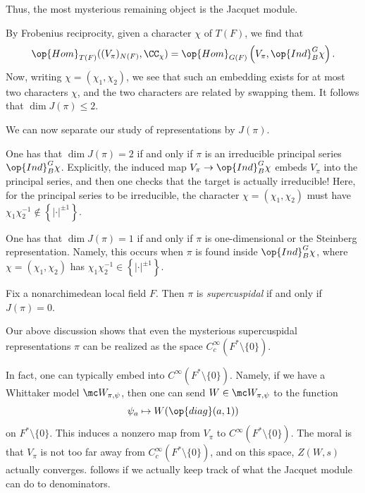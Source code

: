 \documentclass[../notes.tex]{subfiles}
\begin{document}
Thus, the most mysterious remaining object is the Jacquet module.
\begin{remark}
	By Frobenius reciprocity, given a character $\chi$ of $T(F)$, we find that
	\[\op{Hom}_{T(F)}((V_\pi)_{N(F)},\CC_\chi)=\op{Hom}_{G(F)}\left(V_\pi,\op{Ind}_B^G\chi\right).\]
	Now, writing $\chi=(\chi_1,\chi_2)$, we see that such an embedding exists for at most two characters $\chi$, and the two characters are related by swapping them. It follows that $\dim J(\pi)\le2$.
\end{remark}
We can now separate our study of representations by $J(\pi)$.
\begin{example}
	One has that $\dim J(\pi)=2$ if and only if $\pi$ is an irreducible principal series $\op{Ind}_B^G\chi$. Explicitly, the induced map $V_\pi\to\op{Ind}_B^G\chi$ embeds $V_\pi$ into the principal series, and then one checks that the target is actually irreducible! Here, for the principal series to be irreducible, the character $\chi=(\chi_1,\chi_2)$ must have $\chi_1\chi_2^{-1}\notin\left\{\left|\cdot\right|^{\pm1}\right\}$.
\end{example}
\begin{example}
	One has that $\dim J(\pi)=1$ if and only if $\pi$ is one-dimensional or the Steinberg representation. Namely, this occurs when $\pi$ is found inside $\op{Ind}_B^G\chi$, where $\chi=(\chi_1,\chi_2)$ has $\chi_1\chi_2^{-1}\in\left\{\left|\cdot\right|^{\pm1}\right\}$.
\end{example}
\begin{definition}[supercuspidal]
	Fix a nonarchimedean local field $F$. Then $\pi$ is \textit{supercuspidal} if and only if $J(\pi)=0$.
\end{definition}
\begin{remark}
	Our above discussion shows that even the mysterious supercuspidal representations $\pi$ can be realized as the space $C_c^\infty(F^*\setminus\{0\})$.
\end{remark}
\begin{remark}
	In fact, one can typically embed into $C^\infty(F^*\setminus\{0\})$. Namely, if we have a Whittaker model $\mc W_{\pi,\psi}$, then one can send $W\in\mc W_{\pi,\psi}$ to the function
	\[\psi_a\mapsto W(\op{diag}(a,1))\]
	on $F^*\setminus\{0\}$. This induces a nonzero map from $V_\pi$ to $C^\infty(F^*\setminus\{0\})$. The moral is that $V_\pi$ is not too far away from $C_c^\infty(F^*\setminus\{0\})$, and on this space, $Z(W,s)$ actually converges.  follows if we actually keep track of what the Jacquet module can do to denominators.
\end{remark}
\end{document}
